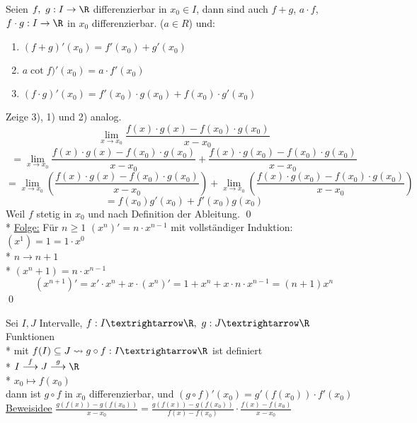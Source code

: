 Seien $f,\ g: I \to \R$ differenzierbar in $x_0 \in I$, dann sind auch $f + g$, $a \cdot f$, $f \cdot g: I \to \R$ in $x_0$ differenzierbar. ($a \in R$) und:
\begin{enumerate}
\item{$(f + g)'(x_0) = f'(x_0) + g'(x_0)$}
\item{$a \cot f)'(x_0) = a \cdot f'(x_0)$}
\item{$(f \cdot g)'(x_0) = f'(x_0) \cdot g(x_0) + f(x_0) \cdot g'(x_0)$}
\end{enumerate}
\bew
Zeige 3), 1) und 2) analog.\\
$$ \lim_{x \to x_0} \frac{f(x) \cdot g(x) - f(x_0) \cdot g(x_0)}{x - x_0}$$
$$= \lim_{x \to x_0} \frac{f(x) \cdot g(x) - f(x_0) \cdot g(x_0)}{x - x_0} + \frac{f(x) \cdot g(x_0) - f(x_0) \cdot g(x_0)}{x - x_0}$$
$$= \lim_{x \to x_0} \left( \frac{f(x) \cdot g(x) - f(x_0) \cdot g(x_0)}{x - x_0} \right) + \lim_{x \to x_0}\left( \frac{f(x) \cdot g(x_0) - f(x_0) \cdot g(x_0)}{x - x_0} \right)$$
$$=f(x_0)g'(x_0) + f'(x_0)g(x_0)$$
Weil $f$ stetig in $x_0$ und nach Definition der Ableitung. \qed{}\\*
\ul{Folge:} Für $n \geq 1$ $(x^n)' = n \cdot x^{n-1}$
\bew
mit vollständiger Induktion:
$(x^1) = 1 =1 \cdot x^0$ \ok\\*
$n \to n + 1$\\*
$(x^n+1) = n\cdot x^{n-1}$
$$(x^{n+1})' = x' \cdot x^n + x \cdot (x^n)' = 1 + x^n + x \cdot n \cdot x^{n-1} = (n+1) x^n$$ \qed

Sei $I,J$ Intervalle, $f:I→\R,\ g:J→\R$ Funktionen\\*
mit $f(I)\subseteq J \leadsto g\circ f:I→\R$ ist definiert\\*
$I\stackrel{f}{\longrightarrow}J\stackrel{g}{\longrightarrow}\R$\\*
$x_0\longmapsto f(x_0)$\\
dann ist $g\circ f$ in $x_0$ differenzierbar,
und $(g\circ f)'(x_0)=g'(f(x_0))·f'(x_0)$
\ul{Beweisidee} $\frac{g(f(x)) - g(f(x_0))}{x-x_0} = \frac{g(f(x)) - g(f(x_0))}{f(x)-f(x_0)} \cdot \frac{f(x) - f(x_0)}{x-x_0}$